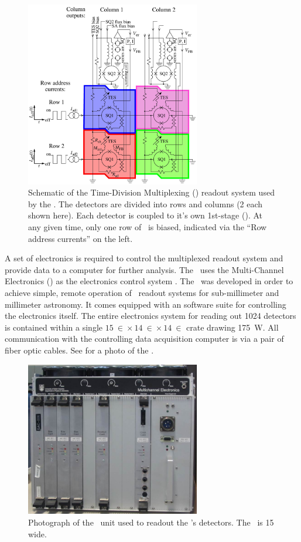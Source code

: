 \begin{figure}
\centering
\includegraphics[width=3in]{images/ch4-tdm-schematic.png}
\caption[Time-Division Multiplexing Schematic]{
  Schematic of the Time-Division Multiplexing (\TDM) readout system used by the \Imager.
  The detectors are divided into rows and columns (2 each shown here).
  Each detector is coupled to it's own 1st-stage \SQUID ().
  At any given time, only one row of \SQUIDs\ is biased, indicated via the ``Row address currents'' on the left.
}
\label{fig:ch4-tdm-schematic}
\end{figure}

A set of electronics is required to control the multiplexed readout system and provide data to a computer for further analysis.
The \Imager\ uses the Multi-Channel Electronics (\MCE) as the electronics control system \cite{battistelli_functional_2008,battistelli_automated_2008,_mcewiki_2014}.
The \MCE\ was developed in order to achieve simple, remote operation of \TDM\ readout systems for sub-millimeter and millimeter astronomy.
It comes equipped with an software suite for controlling the electronics itself.
The entire electronics system for reading out 1024 detectors is contained within a single $\SI{15}{\in} \times \SI{14}{\in} \times \SI{14}{\in}$ crate drawing \SI{175}{\W}.
All communication with the controlling data acquisition computer is via a pair of fiber optic cables.
See  for a photo of the \MCE.

\begin{figure}
\centering
\includegraphics[width=3in]{images/ch4-mce.jpg}
\caption[Photograph of the \MCE]{
  Photograph of the \MCE\ unit used to readout the \Imager's detectors.
  The \MCE\ is \SI{15}{\in} wide.
}
\label{fig:ch4-mce-photo}
\end{figure}

